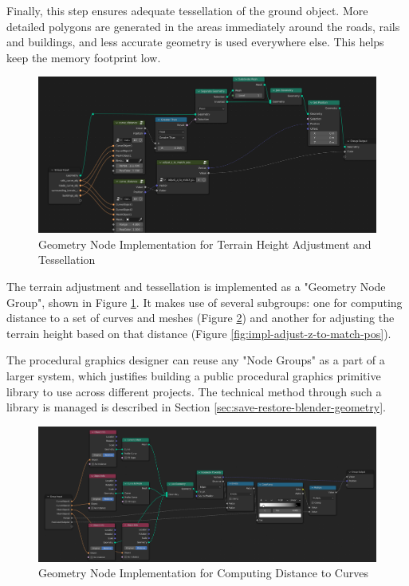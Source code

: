 Finally, this step ensures adequate tessellation of the ground object. More detailed polygons are generated in the areas immediately around the roads, rails and buildings, and less accurate geometry is used everywhere else. This helps keep the memory footprint low.

\begin{figure}[H]
    \centering
    \includegraphics[width=14.5cm]{src/img/pic/pic-2 screenshot of blender adjust terrain geometry node.jpg}
    \caption{Geometry Node Implementation for Terrain Height Adjustment and Tessellation}
    \label{fig:impl-geom-nodes-terrain}
\end{figure}


The terrain adjustment and tessellation is implemented as a "Geometry Node Group", shown in Figure \ref{fig:impl-geom-nodes-terrain}. It makes use of several subgroups: one for computing distance to a set of curves and meshes (Figure \ref{fig:impl-curve-dist}) and another for adjusting the terrain height based on that distance (Figure \ref{fig:impl-adjust-z-to-match-pos}).

The procedural graphics designer can reuse any "Node Groups" as a part of a larger system, which justifies building a public procedural graphics primitive library to use across different projects. The technical method through such a library is managed is described in Section \ref{sec:save-restore-blender-geometry}.

\begin{figure}[H]
    \centering
    \includegraphics[width=14.5cm]{src/img/pic/pic-3 blender geometry screenshot curve_distance.jpg}
    \caption{Geometry Node Implementation for Computing Distance to Curves}
    \label{fig:impl-curve-dist}
\end{figure}

